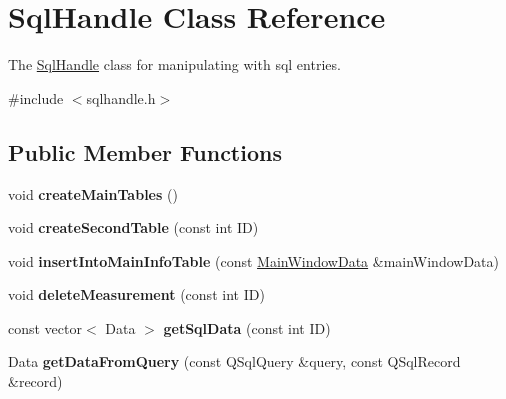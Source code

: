 \hypertarget{classSqlHandle}{\section{Sql\+Handle Class Reference}
\label{classSqlHandle}
}


The \hyperlink{classSqlHandle}{Sql\+Handle} class for manipulating with sql entries.  




{\ttfamily \#include $<$sqlhandle.\+h$>$}

\subsection*{Public Member Functions}
\begin{DoxyCompactItemize}
\item 
\hypertarget{classSqlHandle_a74881baa2b268e2507d361007ca3d071}{void {\bfseries create\+Main\+Tables} ()}\label{classSqlHandle_a74881baa2b268e2507d361007ca3d071}

\item 
\hypertarget{classSqlHandle_a09cc807b1fb5aeda615ba8081f66cc1f}{void {\bfseries create\+Second\+Table} (const int I\+D)}\label{classSqlHandle_a09cc807b1fb5aeda615ba8081f66cc1f}

\item 
\hypertarget{classSqlHandle_a7a0d2c81551b031837bbea9cf97b513e}{void {\bfseries insert\+Into\+Main\+Info\+Table} (const \hyperlink{structMainWindowData}{Main\+Window\+Data} \&main\+Window\+Data)}\label{classSqlHandle_a7a0d2c81551b031837bbea9cf97b513e}

\item 
\hypertarget{classSqlHandle_ac111d82dcd20a975ab64563313403c5f}{void {\bfseries delete\+Measurement} (const int I\+D)}\label{classSqlHandle_ac111d82dcd20a975ab64563313403c5f}

\item 
\hypertarget{classSqlHandle_a8cbd20e9edad986197ceec01897442e7}{const vector$<$ Data $>$ {\bfseries get\+Sql\+Data} (const int I\+D)}\label{classSqlHandle_a8cbd20e9edad986197ceec01897442e7}

\item 
\hypertarget{classSqlHandle_a9e63022701c72474a6baf13f581fbc02}{Data {\bfseries get\+Data\+From\+Query} (const Q\+Sql\+Query \&query, const Q\+Sql\+Record \&record)}\label{classSqlHandle_a9e63022701c72474a6baf13f581fbc02}

\end{DoxyCompactItemize}
